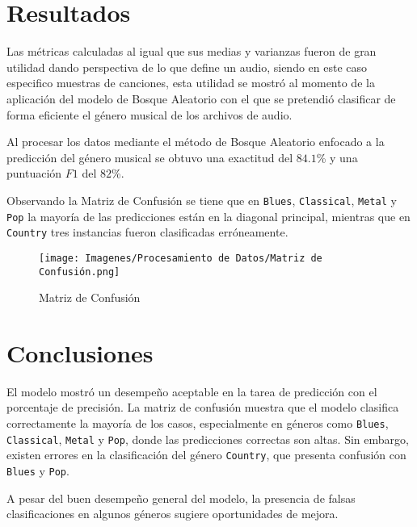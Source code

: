 \documentclass{article}
\begin{document}
\section{Resultados}
Las métricas calculadas al igual que sus medias y varianzas fueron de gran utilidad dando perspectiva de lo que define un audio, siendo en este caso especifico muestras de canciones, esta utilidad se mostró al momento de la aplicación del modelo de Bosque Aleatorio con el que se pretendió clasificar de forma eficiente el género musical de los archivos de audio.

Al procesar los datos mediante el método de Bosque Aleatorio enfocado a la predicción del género musical se obtuvo una exactitud del $84.1$\% y una puntuación $F1$ del $82$\%.

Observando la Matriz de Confusión se tiene que en \texttt{Blues}, \texttt{Classical}, \texttt{Metal} y \texttt{Pop} la mayoría de las predicciones están en la diagonal principal, mientras que en \texttt{Country} tres instancias fueron clasificadas erróneamente.

\begin{figure}
    \centering
    \texttt{[image: Imagenes/Procesamiento de Datos/Matriz de Confusión.png]}
    \caption{Matriz de Confusión}
    \label{fig:enter-label}
\end{figure}

\section{Conclusiones}
El modelo mostró un desempeño aceptable en la tarea de predicción con el porcentaje de precisión. La matriz de confusión muestra que el modelo clasifica correctamente la mayoría de los casos, especialmente en géneros como \texttt{Blues}, \texttt{Classical}, \texttt{Metal} y \texttt{Pop}, donde las predicciones correctas son altas. Sin embargo, existen errores en la clasificación del género \texttt{Country}, que presenta confusión con \texttt{Blues} y \texttt{Pop}.

A pesar del buen desempeño general del modelo, la presencia de falsas clasificaciones en algunos géneros sugiere oportunidades de mejora.



\end{document}
